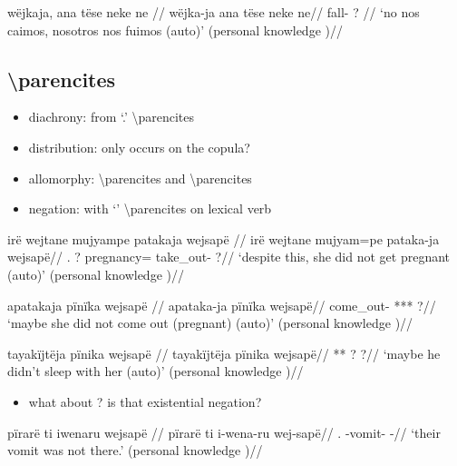 \documentclass{memoir}
\begin{document}
\ex \label{conv1stenc-28}
\begingl \glpreamble wëjkaja, ana tëse neke ne //
\gla wëjka-ja ana tëse neke ne//
\glb fall-  ?  //
\glft ‘no nos caimos, nosotros nos fuimos (auto)’ (personal knowledge
)//
\endgl
\xe

\subsection{\texorpdfstring{
\textbackslash parencites}{ \textbackslash parencites}}

\begin{itemize}
\tightlist
\item
  diachrony: from  `.'
  \textbackslash parencites
\item
  distribution: only occurs on the copula?
\item
  allomorphy:  \textbackslash parencites and 
  \textbackslash parencites
\item
  negation: with  `' \textbackslash parencites on
  lexical verb 
\end{itemize}

\ex \label{ctoaragrme-38}
\begingl \glpreamble irë wejtane mujyampe patakaja wejsapë //
\gla irë wejtane mujyam=pe pataka-ja wejsapë//
\glb {}. ? pregnancy= take\_out- ?//
\glft ‘despite this, she did not get pregnant (auto)’ (personal knowledge
)//
\endgl
\xe

\ex \label{ctoaragrme-39}
\begingl \glpreamble apatakaja pïnïka wejsapë //
\gla apataka-ja pïnïka wejsapë//
\glb come\_out- *** ?//
\glft ‘maybe she did not come out (pregnant) (auto)’ (personal knowledge
)//
\endgl
\xe

\ex \label{ctoaragrme-40}
\begingl \glpreamble tayakïjtëja pïnika wejsapë //
\gla tayakïjtëja pïnika wejsapë//
\glb *** ? ?//
\glft ‘maybe he didn't sleep with her (auto)’ (personal knowledge
)//
\endgl
\xe

\begin{itemize}
\tightlist
\item
  what about ? is that existential negation?
\end{itemize}

\ex \label{ctorat-19}
\begingl \glpreamble pïrarë ti iwenaru wejsapë //
\gla pïrarë ti i-wena-ru wej-sapë//
\glb {}.  -vomit- -//
\glft ‘their vomit was not there.’ (personal knowledge
)//
\endgl
\xe
\end{document}

